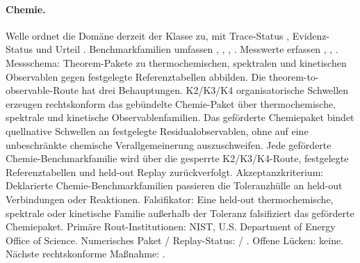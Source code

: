 \paragraph{Chemie.}
Welle  ordnet die Domäne derzeit der Klasse  zu, mit Trace-Status , Evidenz-Status  und Urteil .
Benchmarkfamilien umfassen , \allowbreak {}, \allowbreak {}, \allowbreak {}.
Messwerte erfassen , \allowbreak {}, \allowbreak {}.
Messschema: Theorem-Pakete zu thermochemischen, spektralen und kinetischen Observablen gegen festgelegte Referenztabellen abbilden.
Die theorem-to-observable-Route hat drei Behauptungen. K2/K3/K4 organisatorische Schwellen erzeugen rechtskonform das gebündelte Chemie-Paket über thermochemische, spektrale und kinetische Observablenfamilien. Das geförderte Chemiepaket bindet quellnative Schwellen an festgelegte Residualobservablen, ohne auf eine unbeschränkte chemische Verallgemeinerung auszuschweifen. Jede geförderte Chemie-Benchmarkfamilie wird über die gesperrte K2/K3/K4-Route, festgelegte Referenztabellen und held-out Replay zurückverfolgt.
Akzeptanzkriterium: Deklarierte Chemie-Benchmarkfamilien passieren die Toleranzhülle an held-out Verbindungen oder Reaktionen.
Falsifikator: Eine held-out thermochemische, spektrale oder kinetische Familie außerhalb der Toleranz falsifiziert das geförderte Chemiepaket.
Primäre Rout-Institutionen: NIST, \allowbreak U.S. Department of Energy Office of Science.
Numerisches Paket / Replay-Status:  / .
Offene Lücken: keine.
Nächste rechtskonforme Maßnahme: .

